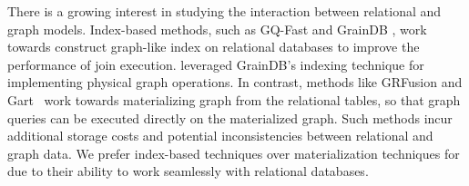  There is a growing interest in studying the interaction between relational and graph models. Index-based methods, such as GQ-Fast \cite{gqfast} and GrainDB \cite{graindb}, work towards construct graph-like index on relational databases to improve the performance of join execution. \name leveraged GrainDB's indexing technique for implementing physical graph operations. In contrast, methods like GRFusion \cite{GRFusion} and Gart~\cite{gart} work towards materializing graph from the relational tables,
so that graph queries can be executed directly on the materialized graph. Such methods incur additional storage costs and potential inconsistencies between relational and graph data.
We prefer index-based techniques over materialization techniques for due to their ability to work seamlessly with relational databases. %






